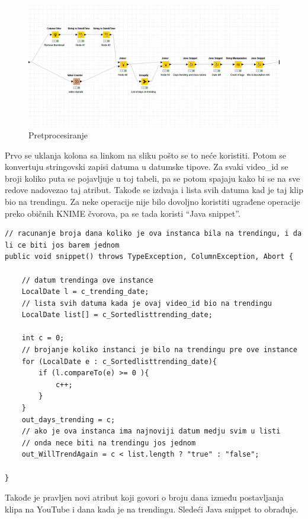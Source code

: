 \documentclass[a4paper]{article}
\theoremstyle{definition}
\begin{document}
\begin{figure}[h!]
\begin{center}
    \includegraphics[width=1\textwidth]{preprocessing.png}
    \caption{Pretprocesiranje}
\end{center}
\end{figure}
Prvo se uklanja kolona sa linkom na sliku pošto se to neće koristiti. Potom se konvertuju stringovski zapisi datuma u datumske tipove. 
Za svaki video\_id se broji koliko puta se pojavljuje u toj tabeli, pa se potom spajaju kako bi se na sve redove nadovezao taj atribut.
Takođe se izdvaja i lista svih datuma kad je taj klip bio na trendingu.
Za neke operacije nije bilo dovoljno koristiti ugrađene operacije preko običnih KNIME  čvorova, pa se tada koristi ``Java snippet''.

\begin{lstlisting}
// racunanje broja dana koliko je ova instanca bila na trendingu, i da li ce biti jos barem jednom
public void snippet() throws TypeException, ColumnException, Abort {

	// datum trendinga ove instance
	LocalDate l = c_trending_date;
	// lista svih datuma kada je ovaj video_id bio na trendingu
	LocalDate list[] = c_Sortedlisttrending_date;

	int c = 0;
	// brojanje koliko instanci je bilo na trendingu pre ove instance
	for (LocalDate e : c_Sortedlisttrending_date){	
		if (l.compareTo(e) >= 0 ){
			c++;
		}
	}
	out_days_trending = c;
	// ako je ova instanca ima najnoviji datum medju svim u listi
	// onda nece biti na trendingu jos jednom
	out_WillTrendAgain = c < list.length ? "true" : "false";

}

\end{lstlisting}


Takođe je pravljen novi atribut koji govori o broju dana između postavljanja klipa na YouTube i dana kada je na trendingu.
Sledeći Java snippet to obrađuje.
\end{document}

